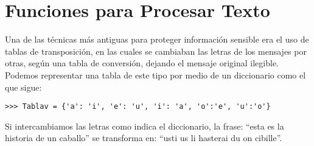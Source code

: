 \section{Funciones para Procesar Texto}

  Una de las técnicas más antiguas para
  proteger información sensible era el uso de
  tablas de transposición,
  en las cuales se cambiaban las letras de los mensajes
  por otras,
  según una tabla de conversión,
  dejando el mensaje original ilegible.
  Podemos representar una tabla de este tipo por medio
  de un diccionario como el que sigue:
  
  \begin{lstlisting}[style=consola]
  >>> Tablav = {'a': 'i', 'e': 'u', 'i': 'a', 'o':'e', 'u':'o'}
  \end{lstlisting}
  
  Si intercambiamos las letras como indica el diccionario,
  la frase: ``esta es la historia de un caballo''
  se transforma en:
  ``usti us li hasterai du on cibille''.
  
